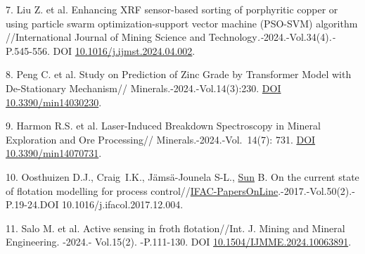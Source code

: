 \begin{refs}
7. Liu Z. et al. Enhancing XRF sensor-based sorting of porphyritic
copper or using particle swarm optimization-support vector machine
(PSO-SVM) algorithm //International Journal of Mining Science and
Technology\emph{.-}2024.-Vol.34(4)\emph{.-}P.545-556. DOI
\href{https://doi.org/10.1016/j.ijmst.2024.04.002}{10.1016/j.ijmst.2024.04.002}.

8. Peng C. et al. Study on Prediction of Zinc Grade by Transformer Model
with De-Stationary Mechanism// Minerals.-2024.-Vol.14(3):230.
\href{https://doi.org/10.3390/min14030230}{DOI 10.3390/min14030230}.

9. Harmon R.S. et al. Laser-Induced Breakdown Spectroscopy in Mineral
Exploration and Ore Processing// Minerals.-2024.-Vol.~14(7): 731.
\href{https://doi.org/10.3390/min14070731}{DOI 10.3390/min14070731}.

10. Oosthuizen D.J., Craig~I.K., Jämsä-Jounela S-L.,
\href{https://www.sciencedirect.com/author/55460745900/bei-sun}{Sun} B.
On the current state of flotation modelling for process
control//\href{https://www.sciencedirect.com/journal/ifac-papersonline}{IFAC-PapersOnLine}.-2017.-Vol.50(2).-P.19-24.DOI
10.1016/j.ifacol.2017.12.004.

11. Salo M. et al. Active sensing in froth flotation//Int. J. Mining and
Mineral Engineering. -2024.- Vol.15(2). -P.111-130. DOI
\href{https://doi.org/10.1504/IJMME.2024.10063891}{10.1504/IJMME.2024.10063891}.
\end{refs}

